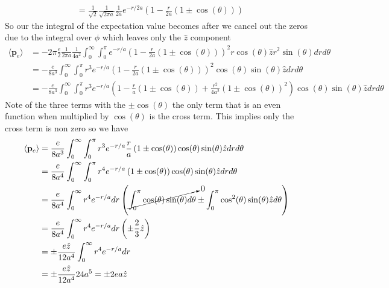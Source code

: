 \documentclass[11pt]{article}
\numberwithin{equation}{section}
\begin{document}
\begin{enumerate}[(a)]
\begin{align*}
&=  \frac{1}{\sqrt{2}}\frac{1}{\sqrt{2\pi a}}\frac{1}{2a}e^{-r/2a}\left(1-\frac{r}{2a}\left(1 \pm \cos(\theta)\right)\right)
\end{align*}
So our the integral of the expectation value becomes after we cancel out the zeros due to the integral over $\phi$ which leaves only the $\hat{z}$ component
\begin{align*}
\langle\mathbf{p}_e\rangle &=  -2\pi\frac{e}{2}\frac{1}{2\pi a}\frac{1}{4a^2}\int_{0}^{\infty}\int_{0}^{\pi}e^{-r/a}\left(1-\frac{r}{2a}\left(1 \pm \cos(\theta)\right)\right)^2r\cos(\theta)\hat{z}r^2\sin(\theta)drd\theta\\
&=  -\frac{e}{8 a^3}\int_{0}^{\infty}\int_{0}^{\pi}r^3e^{-r/a}\left(1-\frac{r}{2a}\left(1 \pm \cos(\theta)\right)\right)^2\cos(\theta)\sin(\theta)\hat{z}drd\theta\\
&=  -\frac{e}{8 a^3}\int_{0}^{\infty}\int_{0}^{\pi}r^3e^{-r/a}\left(1 - \frac{r}{a}\left(1 \pm \cos(\theta)\right) + \frac{r^2}{4a^2}\left(1 \pm \cos(\theta)\right)^2\right)\cos(\theta)\sin(\theta)\hat{z}drd\theta
\end{align*}
Note of the three terms with the $\pm\cos(\theta)$ the only term that is an even function when multiplied by $\cos(\theta)$ is the cross term. This implies only the cross term is non zero so we have
\begin{align*}
\langle\mathbf{p}_e\rangle &=  \frac{e}{8 a^3}\int_{0}^{\infty}\int_{0}^{\pi}r^3e^{-r/a}\frac{r}{a}\left(1 \pm \cos(\theta)\right)\cos(\theta)\sin(\theta)\hat{z}drd\theta\\
&=  \frac{e}{8 a^4}\int_{0}^{\infty}\int_{0}^{\pi}r^4e^{-r/a}\left(1 \pm \cos(\theta)\right)\cos(\theta)\sin(\theta)\hat{z}drd\theta\\
&=  \frac{e}{8 a^4}\int_{0}^{\infty}r^4e^{-r/a}dr\left(\cancelto{0}{\int_{0}^{\pi}\cos(\theta)\sin(\theta)d\theta} \pm \int_{0}^{\pi}\cos^2(\theta)\sin(\theta)\hat{z}d\theta\right)\\
&=  \frac{e}{8 a^4}\int_{0}^{\infty}r^4e^{-r/a}dr\left(\pm \frac{2}{3}\hat{z}\right)\\
&=  \pm\frac{e\hat{z}}{12 a^4}\int_{0}^{\infty}r^4e^{-r/a}dr\\
&=  \pm\frac{e\hat{z}}{12 a^4}24a^5 = \pm2ea\hat{z}
\end{align*}
\end{enumerate}
\end{document}
